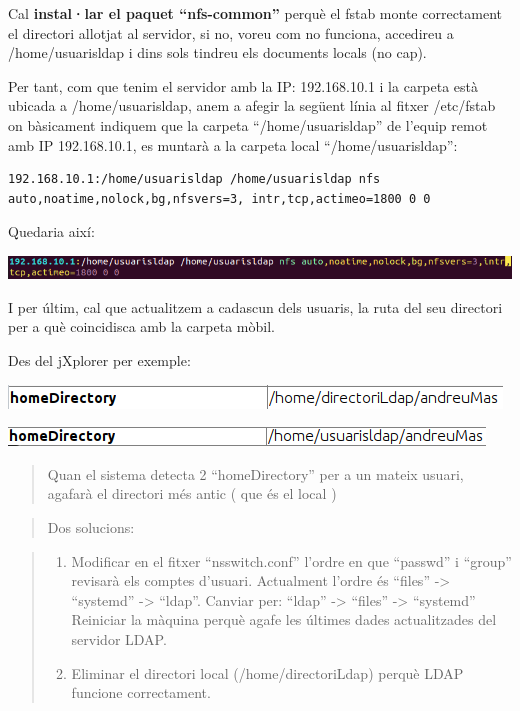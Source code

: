 \documentclass[
  12 pt,
  a4paper,
]{article}
\begin{document}
Cal \textbf{instal·lar el paquet ``nfs-common''} perquè el fstab monte
correctament el directori allotjat al servidor, si no, voreu com no
funciona, accedireu a /home/usuarisldap i dins sols tindreu els
documents locals (no cap).

Per tant, com que tenim el servidor amb la IP: 192.168.10.1 i la carpeta
està ubicada a /home/usuarisldap, anem a afegir la següent línia al
fitxer /etc/fstab on bàsicament indiquem que la carpeta
``/home/usuarisldap'' de l'equip remot amb IP 192.168.10.1, es muntarà a
la carpeta local ``/home/usuarisldap'':

\begin{verbatim}
192.168.10.1:/home/usuarisldap /home/usuarisldap nfs auto,noatime,nolock,bg,nfsvers=3, intr,tcp,actimeo=1800 0 0
\end{verbatim}

Quedaria així:

\includegraphics{png/perfilmobil1.png}

I per últim, cal que actualitzem a cadascun dels usuaris, la ruta del
seu directori per a què coincidisca amb la carpeta mòbil.

Des del jXplorer per exemple:

\includegraphics{png/perfilmobil2.png}

\includegraphics{png/perfilmobil3.png}

\begin{quote}
Quan el sistema detecta 2 ``homeDirectory'' per a un mateix usuari,
agafarà el directori més antic ( que és el local )
\end{quote}

\begin{quote}
Dos solucions:
\end{quote}

\begin{quote}
\begin{enumerate}
\def\labelenumi{\arabic{enumi}.}
\item
  Modificar en el fitxer ``nsswitch.conf'' l'ordre en que ``passwd'' i
  ``group'' revisarà els comptes d'usuari. Actualment l'ordre és
  ``files'' -\textgreater{} ``systemd'' -\textgreater{} ``ldap''.
  Canviar per: ``ldap'' -\textgreater{} ``files'' -\textgreater{}
  ``systemd'' Reiniciar la màquina perquè agafe les últimes dades
  actualitzades del servidor LDAP.
\item
  Eliminar el directori local (/home/directoriLdap) perquè LDAP funcione
  correctament.
\end{enumerate}
\end{quote}
\end{document}
